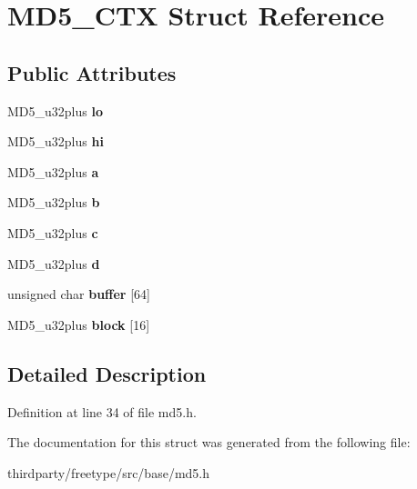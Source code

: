 \hypertarget{struct_m_d5___c_t_x}{}\section{M\+D5\+\_\+\+C\+TX Struct Reference}
\label{struct_m_d5___c_t_x}
\subsection*{Public Attributes}
\begin{DoxyCompactItemize}
\item 
\mbox{\label{struct_m_d5___c_t_x_a90437ec62a8dda787f1667061d9755fe}} 
M\+D5\+\_\+u32plus {\bfseries lo}
\item 
\mbox{\label{struct_m_d5___c_t_x_a3234f683810977ac629c2a8a05a1cc87}} 
M\+D5\+\_\+u32plus {\bfseries hi}
\item 
\mbox{\label{struct_m_d5___c_t_x_abfbd731eb0b9d13a75ee4e49715e30b5}} 
M\+D5\+\_\+u32plus {\bfseries a}
\item 
\mbox{\label{struct_m_d5___c_t_x_a63ef5819a909e0b4065796dfdac25962}} 
M\+D5\+\_\+u32plus {\bfseries b}
\item 
\mbox{\label{struct_m_d5___c_t_x_a6226440d9b52200d32153df206fe3761}} 
M\+D5\+\_\+u32plus {\bfseries c}
\item 
\mbox{\label{struct_m_d5___c_t_x_a3b2316dbfcad4bdb1306dc441761f396}} 
M\+D5\+\_\+u32plus {\bfseries d}
\item 
\mbox{\label{struct_m_d5___c_t_x_a2da73ecf544745f58211e998719f367f}} 
unsigned char {\bfseries buffer} \mbox{[}64\mbox{]}
\item 
\mbox{\label{struct_m_d5___c_t_x_a2db62677a153981a205d225b051f0609}} 
M\+D5\+\_\+u32plus {\bfseries block} \mbox{[}16\mbox{]}
\end{DoxyCompactItemize}


\subsection{Detailed Description}


Definition at line 34 of file md5.\+h.



The documentation for this struct was generated from the following file\+:\begin{DoxyCompactItemize}
\item 
thirdparty/freetype/src/base/md5.\+h\end{DoxyCompactItemize}
